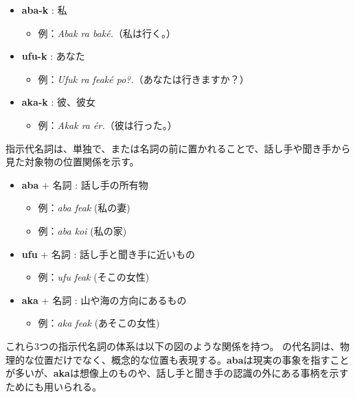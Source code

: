 \begin{itemize}
    \item \textbf{aba-k} : 私
    \begin{itemize}
        \item 例：\textit{Abak ra bak\'e.}（私は行く。）
    \end{itemize}
    \item \textbf{ufu-k} : あなた
    \begin{itemize}
        \item 例：\textit{Ufuk ra feak\'e po?.}（あなたは行きますか？）
    \end{itemize}
    \item \textbf{aka-k} : 彼、彼女
    \begin{itemize}
        \item 例：\textit{Akak ra \'er.}（彼は行った。）
    \end{itemize}
\end{itemize}

指示代名詞は、単独で、または名詞の前に置かれることで、話し手や聞き手から見た対象物の位置関係を示す。

\begin{itemize}
    \item \textbf{aba} + 名詞 : 話し手の所有物
    \begin{itemize}
        \item 例：\textit{aba feak} (私の妻)
        \item 例：\textit{aba koi} (私の家)
    \end{itemize}
    \item \textbf{ufu} + 名詞 : 話し手と聞き手に近いもの
    \begin{itemize}
        \item 例：\textit{ufu feak} (そこの女性)
    \end{itemize}
    \item \textbf{aka} + 名詞 : 山や海の方向にあるもの
    \begin{itemize}
        \item 例：\textit{aka feak} (あそこの女性)
    \end{itemize}
\end{itemize}

これら3つの指示代名詞の体系は以下の図のような関係を持つ。
\langname の代名詞は、物理的な位置だけでなく、概念的な位置も表現する。\textbf{aba}は現実の事象を指すことが多いが、\textbf{aka}は想像上のものや、話し手と聞き手の認識の外にある事柄を示すためにも用いられる。

